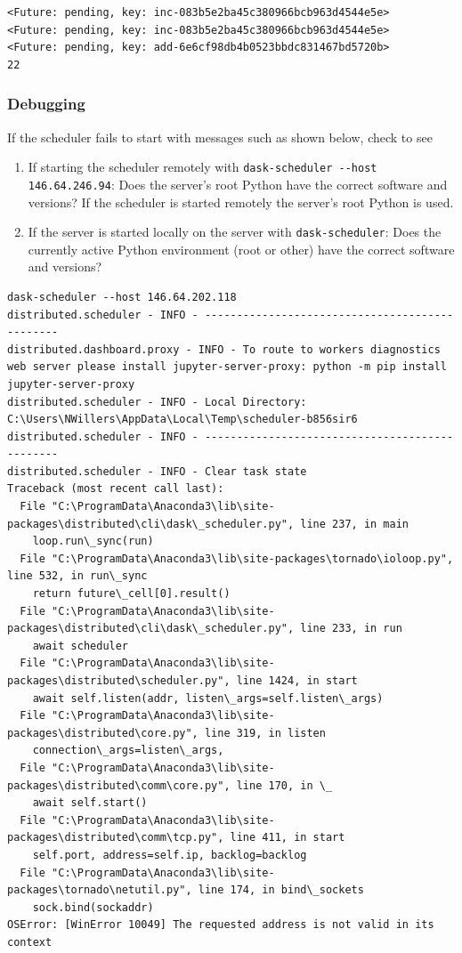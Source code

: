\begin{lstlisting}[style=outcellstyle]
<Future: pending, key: inc-083b5e2ba45c380966bcb963d4544e5e>
<Future: pending, key: inc-083b5e2ba45c380966bcb963d4544e5e>
<Future: pending, key: add-6e6cf98db4b0523bbdc831467bd5720b>
22

\end{lstlisting}


\subsubsection{Debugging}
\label{sec:Debugging}

If the scheduler fails to start with messages such as shown below, check to see


\begin{enumerate}
\item If starting the scheduler remotely with \verb+dask-scheduler --host 146.64.246.94+: Does the server's root Python have the correct software and versions? If the scheduler is started remotely the server's root Python is used.
\item If the server is started locally on the server with \verb+dask-scheduler+: Does the currently active Python environment (root or other) have the correct software and versions?
\end{enumerate}

\begin{lstlisting}[style=tinysize]
dask-scheduler --host 146.64.202.118
distributed.scheduler - INFO - -----------------------------------------------
distributed.dashboard.proxy - INFO - To route to workers diagnostics web server please install jupyter-server-proxy: python -m pip install jupyter-server-proxy
distributed.scheduler - INFO - Local Directory: C:\Users\NWillers\AppData\Local\Temp\scheduler-b856sir6
distributed.scheduler - INFO - -----------------------------------------------
distributed.scheduler - INFO - Clear task state
Traceback (most recent call last):
  File "C:\ProgramData\Anaconda3\lib\site-packages\distributed\cli\dask\_scheduler.py", line 237, in main
    loop.run\_sync(run)
  File "C:\ProgramData\Anaconda3\lib\site-packages\tornado\ioloop.py", line 532, in run\_sync
    return future\_cell[0].result()
  File "C:\ProgramData\Anaconda3\lib\site-packages\distributed\cli\dask\_scheduler.py", line 233, in run
    await scheduler
  File "C:\ProgramData\Anaconda3\lib\site-packages\distributed\scheduler.py", line 1424, in start
    await self.listen(addr, listen\_args=self.listen\_args)
  File "C:\ProgramData\Anaconda3\lib\site-packages\distributed\core.py", line 319, in listen
    connection\_args=listen\_args,
  File "C:\ProgramData\Anaconda3\lib\site-packages\distributed\comm\core.py", line 170, in \_
    await self.start()
  File "C:\ProgramData\Anaconda3\lib\site-packages\distributed\comm\tcp.py", line 411, in start
    self.port, address=self.ip, backlog=backlog
  File "C:\ProgramData\Anaconda3\lib\site-packages\tornado\netutil.py", line 174, in bind\_sockets
    sock.bind(sockaddr)
OSError: [WinError 10049] The requested address is not valid in its context
\end{lstlisting}





